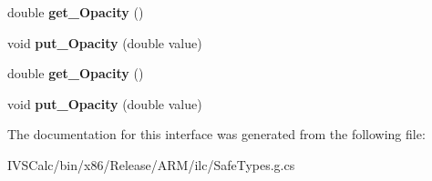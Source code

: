 \begin{DoxyCompactItemize}
double {\bfseries get\+\_\+\+Opacity} ()
\item 
\mbox{\label{interface_windows_1_1_u_i_1_1_xaml_1_1_media_1_1_i_brush_a715be355dc2656455f941a20044b1326}} 
void {\bfseries put\+\_\+\+Opacity} (double value)
\item 
\mbox{\label{interface_windows_1_1_u_i_1_1_xaml_1_1_media_1_1_i_brush_a1ea962c70b9c83e0b80abb640196a615}} 
double {\bfseries get\+\_\+\+Opacity} ()
\item 
\mbox{\label{interface_windows_1_1_u_i_1_1_xaml_1_1_media_1_1_i_brush_a715be355dc2656455f941a20044b1326}} 
void {\bfseries put\+\_\+\+Opacity} (double value)
\end{DoxyCompactItemize}


The documentation for this interface was generated from the following file\+:\begin{DoxyCompactItemize}
\item 
I\+V\+S\+Calc/bin/x86/\+Release/\+A\+R\+M/ilc/Safe\+Types.\+g.\+cs\end{DoxyCompactItemize}
